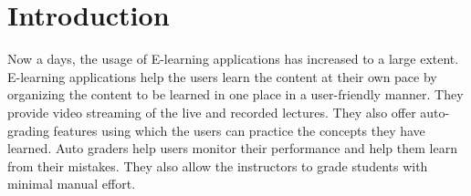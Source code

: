 \documentclass{iitbreport}
\begin{document}


 

                    




\makecontents %


\cleardoublepage
\setcounter{page}{1}


\chapter{Introduction}
Now a days, the usage of E-learning applications has increased to a large extent. E-learning applications help the users learn the content at their own pace by organizing the content to be learned in one place in a user-friendly manner. They provide video streaming of the live and recorded lectures. They also offer auto-grading features using which the users can practice the concepts they have learned. Auto graders help users monitor their performance and help them learn from their mistakes. They also allow the instructors to grade students with minimal manual effort.
\end{document}
